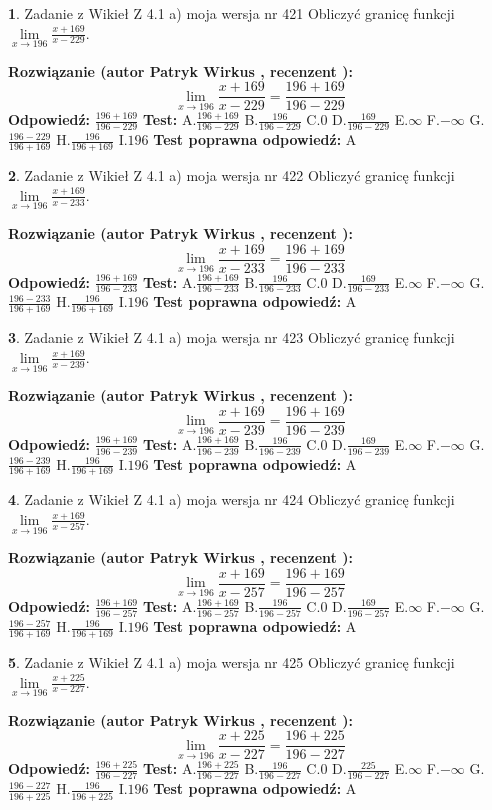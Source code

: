 \documentclass[12pt, a4paper]{article}
\theoremstyle{definition} %
\newtheorem{zad}{}
\newcommand{\zadStart}[1]{\begin{zad}#1\newline}
\newcommand{\zadStop}{\end{zad}}
\newcommand{\rozwStart}[2]{\noindent \textbf{Rozwiązanie (autor #1 , recenzent #2): }\newline}
\newcommand{\rozwStop}{\newline}
\newcommand{\odpStart}{\noindent \textbf{Odpowiedź:}\newline}
\newcommand{\odpStop}{\newline}
\newcommand{\testStart}{\noindent \textbf{Test:}\newline}
\newcommand{\testStop}{\newline}
\newcommand{\kluczStart}{\noindent \textbf{Test poprawna odpowiedź:}\newline}
\newcommand{\kluczStop}{\newline}
\begin{document}
\zadStart{Zadanie z Wikieł Z 4.1 a) moja wersja nr 421}
Obliczyć granicę funkcji $\lim\limits_{x\to196}\frac{x+169}{x-229}$.
\zadStop
\rozwStart{Patryk Wirkus}{}
$$\lim\limits_{x\to196}\frac{x+169}{x-229} = \frac{196+169}{196-229}$$
\rozwStop
\odpStart
$\frac{196+169}{196-229}$
\odpStop
\testStart
A.$\frac{196+169}{196-229}$
B.$\frac{196}{196-229}$
C.$0$
D.$\frac{169}{196-229}$
E.$\infty$
F.$-\infty$
G.$\frac{196-229}{196+169}$
H.$\frac{196}{196+169}$
I.$196$
\testStop
\kluczStart
A
\kluczStop



\zadStart{Zadanie z Wikieł Z 4.1 a) moja wersja nr 422}
Obliczyć granicę funkcji $\lim\limits_{x\to196}\frac{x+169}{x-233}$.
\zadStop
\rozwStart{Patryk Wirkus}{}
$$\lim\limits_{x\to196}\frac{x+169}{x-233} = \frac{196+169}{196-233}$$
\rozwStop
\odpStart
$\frac{196+169}{196-233}$
\odpStop
\testStart
A.$\frac{196+169}{196-233}$
B.$\frac{196}{196-233}$
C.$0$
D.$\frac{169}{196-233}$
E.$\infty$
F.$-\infty$
G.$\frac{196-233}{196+169}$
H.$\frac{196}{196+169}$
I.$196$
\testStop
\kluczStart
A
\kluczStop



\zadStart{Zadanie z Wikieł Z 4.1 a) moja wersja nr 423}
Obliczyć granicę funkcji $\lim\limits_{x\to196}\frac{x+169}{x-239}$.
\zadStop
\rozwStart{Patryk Wirkus}{}
$$\lim\limits_{x\to196}\frac{x+169}{x-239} = \frac{196+169}{196-239}$$
\rozwStop
\odpStart
$\frac{196+169}{196-239}$
\odpStop
\testStart
A.$\frac{196+169}{196-239}$
B.$\frac{196}{196-239}$
C.$0$
D.$\frac{169}{196-239}$
E.$\infty$
F.$-\infty$
G.$\frac{196-239}{196+169}$
H.$\frac{196}{196+169}$
I.$196$
\testStop
\kluczStart
A
\kluczStop



\zadStart{Zadanie z Wikieł Z 4.1 a) moja wersja nr 424}
Obliczyć granicę funkcji $\lim\limits_{x\to196}\frac{x+169}{x-257}$.
\zadStop
\rozwStart{Patryk Wirkus}{}
$$\lim\limits_{x\to196}\frac{x+169}{x-257} = \frac{196+169}{196-257}$$
\rozwStop
\odpStart
$\frac{196+169}{196-257}$
\odpStop
\testStart
A.$\frac{196+169}{196-257}$
B.$\frac{196}{196-257}$
C.$0$
D.$\frac{169}{196-257}$
E.$\infty$
F.$-\infty$
G.$\frac{196-257}{196+169}$
H.$\frac{196}{196+169}$
I.$196$
\testStop
\kluczStart
A
\kluczStop



\zadStart{Zadanie z Wikieł Z 4.1 a) moja wersja nr 425}
Obliczyć granicę funkcji $\lim\limits_{x\to196}\frac{x+225}{x-227}$.
\zadStop
\rozwStart{Patryk Wirkus}{}
$$\lim\limits_{x\to196}\frac{x+225}{x-227} = \frac{196+225}{196-227}$$
\rozwStop
\odpStart
$\frac{196+225}{196-227}$
\odpStop
\testStart
A.$\frac{196+225}{196-227}$
B.$\frac{196}{196-227}$
C.$0$
D.$\frac{225}{196-227}$
E.$\infty$
F.$-\infty$
G.$\frac{196-227}{196+225}$
H.$\frac{196}{196+225}$
I.$196$
\testStop
\kluczStart
A
\kluczStop
\end{document}
